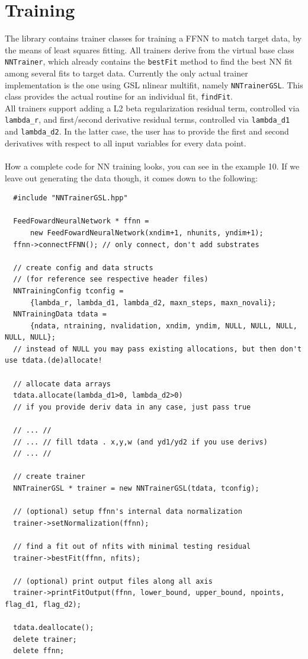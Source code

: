 \documentclass[11pt,a4paper,twoside]{article}
\begin{document}

\section{Training} %
\label{sec:training}

The library contains trainer classes for training a FFNN to match target data,
by the means of least squares fitting. All trainers derive from the virtual base class
\verb+NNTrainer+, which already contains the \verb+bestFit+ method to find the
best NN fit among several fits to target data.
Currently the only actual trainer implementation is the one using GSL nlinear
multifit, namely \verb+NNTrainerGSL+. This class provides the actual routine for
an individual fit, \verb+findFit+.
\\All trainers support adding a L2 beta regularization residual term, controlled via
\verb+lambda_r+, and first/second derivative residual terms, controlled via
\verb+lambda_d1+ and \verb+lambda_d2+. In the latter case, the user has to
provide the first and second derivatives with respect to all input variables for
every data point.
\\\\How a complete code for NN training looks, you can see in the example 10.
If we leave out generating the data though, it comes down to the following:
\begin{lstlisting}
  #include "NNTrainerGSL.hpp"

  FeedFowardNeuralNetwork * ffnn =
      new FeedFowardNeuralNetwork(xndim+1, nhunits, yndim+1);
  ffnn->connectFFNN(); // only connect, don't add substrates

  // create config and data structs
  // (for reference see respective header files)
  NNTrainingConfig tconfig =
      {lambda_r, lambda_d1, lambda_d2, maxn_steps, maxn_novali};
  NNTrainingData tdata =
      {ndata, ntraining, nvalidation, xndim, yndim, NULL, NULL, NULL, NULL, NULL};
  // instead of NULL you may pass existing allocations, but then don't use tdata.(de)allocate!  

  // allocate data arrays
  tdata.allocate(lambda_d1>0, lambda_d2>0)
  // if you provide deriv data in any case, just pass true

  // ... //
  // ... // fill tdata . x,y,w (and yd1/yd2 if you use derivs)
  // ... //

  // create trainer
  NNTrainerGSL * trainer = new NNTrainerGSL(tdata, tconfig);

  // (optional) setup ffnn's internal data normalization
  trainer->setNormalization(ffnn);

  // find a fit out of nfits with minimal testing residual
  trainer->bestFit(ffnn, nfits);

  // (optional) print output files along all axis
  trainer->printFitOutput(ffnn, lower_bound, upper_bound, npoints, flag_d1, flag_d2);

  tdata.deallocate();
  delete trainer;
  delete ffnn;

\end{lstlisting}
\end{document}
